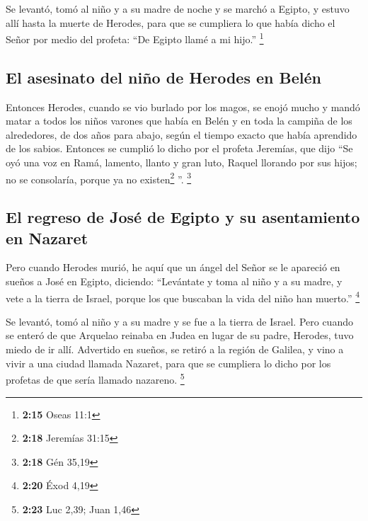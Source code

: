 \begin{paracol}{2}
 Se levantó, tomó al niño y a su madre de noche y se
marchó a Egipto,  y estuvo allí hasta la muerte de
Herodes, para que se cumpliera lo que había dicho el Señor por medio del
profeta: ``De Egipto llamé a mi hijo.'' \footnote{\textbf{2:15} Oseas
  11:1}

\hypertarget{el-asesinato-del-niuxf1o-de-herodes-en-beluxe9n}{%
\subsection{El asesinato del niño de Herodes en
Belén}\label{el-asesinato-del-niuxf1o-de-herodes-en-beluxe9n}}

 Entonces Herodes, cuando se vio burlado por los magos,
se enojó mucho y mandó matar a todos los niños varones que había en
Belén y en toda la campiña de los alrededores, de dos años para abajo,
según el tiempo exacto que había aprendido de los sabios.
 Entonces se cumplió lo dicho por el profeta Jeremías,
que dijo  ``Se oyó una voz en Ramá, lamento, llanto y
gran luto, Raquel llorando por sus hijos; no se consolaría, porque ya no
existen\footnote{\textbf{2:18} Jeremías 31:15} ''. \footnote{\textbf{2:18}
  Gén 35,19}

\hypertarget{el-regreso-de-josuxe9-de-egipto-y-su-asentamiento-en-nazaret}{%
\subsection{El regreso de José de Egipto y su asentamiento en
Nazaret}\label{el-regreso-de-josuxe9-de-egipto-y-su-asentamiento-en-nazaret}}

 Pero cuando Herodes murió, he aquí que un ángel del
Señor se le apareció en sueños a José en Egipto, diciendo:
 ``Levántate y toma al niño y a su madre, y vete a la
tierra de Israel, porque los que buscaban la vida del niño han muerto.''
\footnote{\textbf{2:20} Éxod 4,19}

 Se levantó, tomó al niño y a su madre y se fue a la
tierra de Israel.  Pero cuando se enteró de que Arquelao
reinaba en Judea en lugar de su padre, Herodes, tuvo miedo de ir allí.
Advertido en sueños, se retiró a la región de Galilea,  y
vino a vivir a una ciudad llamada Nazaret, para que se cumpliera lo
dicho por los profetas de que sería llamado nazareno. \footnote{\textbf{2:23}
  Luc 2,39; Juan 1,46}

\switchcolumn
\begin{otherlanguage}{english}


\end{otherlanguage}
\end{paracol}
